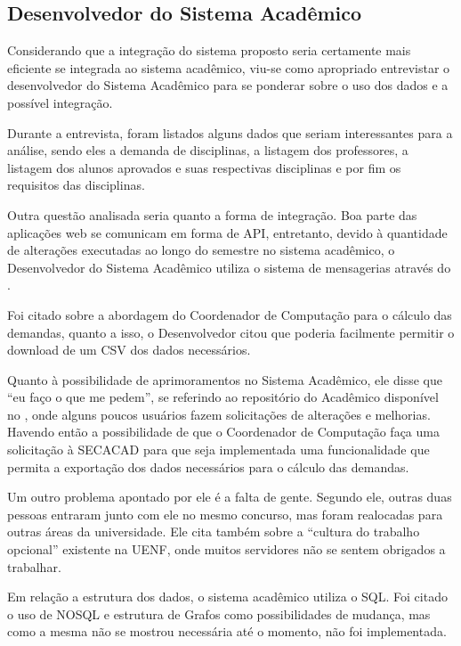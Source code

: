 \subsection{Desenvolvedor do Sistema Acadêmico} %

Considerando que a integração do sistema proposto seria certamente mais eficiente se integrada ao sistema acadêmico, viu-se como apropriado entrevistar o desenvolvedor do Sistema Acadêmico para se ponderar sobre o uso dos dados e a possível integração.

Durante a entrevista, foram listados alguns dados que seriam interessantes para a análise, sendo eles a demanda de disciplinas, a listagem dos professores, a listagem dos alunos aprovados e suas respectivas disciplinas e por fim os requisitos das disciplinas.


Outra questão analisada seria quanto a forma de integração. Boa parte das aplicações web se comunicam em forma de API, entretanto, devido à quantidade de alterações executadas ao longo do semestre no sistema acadêmico, o Desenvolvedor do Sistema Acadêmico utiliza o sistema de mensagerias através do .

Foi citado sobre a abordagem do Coordenador de Computação para o cálculo das demandas, quanto a isso, o Desenvolvedor citou que poderia facilmente permitir o download de um CSV dos dados necessários.

Quanto à possibilidade de aprimoramentos no Sistema Acadêmico, ele disse que ``eu faço o que me pedem'', se referindo ao repositório do Acadêmico disponível no , onde alguns poucos usuários fazem solicitações de alterações e melhorias. Havendo então a possibilidade de que o Coordenador de Computação faça uma solicitação à SECACAD para que seja implementada uma funcionalidade que permita a exportação dos dados necessários para o cálculo das demandas.

Um outro problema apontado por ele é a falta de gente. Segundo ele, outras duas pessoas entraram junto com ele no mesmo concurso, mas foram realocadas para outras áreas da universidade. Ele cita também sobre a ``cultura do trabalho opcional'' existente na UENF, onde muitos servidores não se sentem obrigados a trabalhar.

Em relação a estrutura dos dados, o sistema acadêmico utiliza o SQL. Foi citado o uso de NOSQL e estrutura de Grafos como possibilidades de mudança, mas como a mesma não se mostrou necessária até o momento, não foi implementada.

